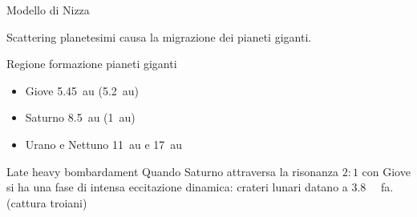 \begin{frame}{Modello di Nizza}

Scattering planetesimi causa la migrazione dei pianeti giganti.

\begin{block}{Regione formazione pianeti giganti}
\begin{itemize}
\item Giove \SI{5.45}{\astronomicalunit} (\SI{5.2}{\astronomicalunit})
\item Saturno \SI{8.5}{\astronomicalunit} (\SI{1}{\astronomicalunit})
\item Urano e Nettuno \SI{11}{\astronomicalunit} e \SI{17}{\astronomicalunit}
\end{itemize}
\end{block}
\begin{block}{Late heavy bombardament}
Quando Saturno attraversa la risonanza $2:1$ con Giove si ha una fase di intensa eccitazione dinamica: crateri lunari datano a \SI{3.8}{\giga\year} fa. (cattura troiani)
\end{block}
\end{frame}
        